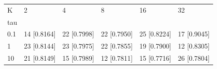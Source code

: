 \begin{tabular}{llllll}
\toprule
K & 2 & 4 & 8 & 16 & 32 \\
tau &  &  &  &  &  \\
\midrule
0.1 & 14 [0.8164] & 22 [0.7998] & 22 [0.7950] & 25 [0.8224] & 17 [0.9045] \\
1 & 23 [0.8144] & 23 [0.7975] & 22 [0.7855] & 19 [0.7900] & 12 [0.8305] \\
10 & 21 [0.8149] & 15 [0.7989] & 12 [0.7811] & 15 [0.7716] & 26 [0.7804] \\
\bottomrule
\end{tabular}
